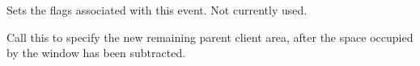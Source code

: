 \label{wxcalculatelayouteventsetflags}


Sets the flags associated with this event. Not currently used.

\label{wxcalculatelayouteventsetrect}


Call this to specify the new remaining parent client area, after the space occupied by the
window has been subtracted.

